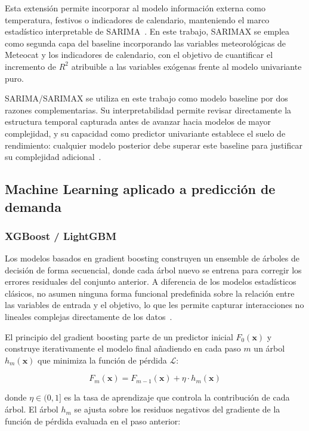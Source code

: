 \documentclass[12pt, a4paper]{article}
\begin{document}
Esta extensión permite incorporar al modelo información externa como temperatura, festivos o indicadores de calendario, manteniendo el marco estadístico interpretable de SARIMA~\cite{hyndman2021}. En este trabajo, SARIMAX se emplea como segunda capa del baseline incorporando las variables meteorológicas de Meteocat y los indicadores de calendario, con el objetivo de cuantificar el incremento de $R^2$ atribuible a las variables exógenas frente al modelo univariante puro.

SARIMA/SARIMAX se utiliza en este trabajo como modelo baseline por dos razones complementarias. Su interpretabilidad permite revisar directamente la estructura temporal capturada antes de avanzar hacia modelos de mayor complejidad, y su capacidad como predictor univariante establece el suelo de rendimiento: cualquier modelo posterior debe superar este baseline para justificar su complejidad adicional~\cite{hyndman2021, boxjenkins2015}.

\subsection{Machine Learning aplicado a predicción de demanda}

\subsubsection{XGBoost / LightGBM}

Los modelos basados en gradient boosting construyen un ensemble de árboles de decisión de forma secuencial, donde cada árbol nuevo se entrena para corregir los errores residuales del conjunto anterior. A diferencia de los modelos estadísticos clásicos, no asumen ninguna forma funcional predefinida sobre la relación entre las variables de entrada y el objetivo, lo que les permite capturar interacciones no lineales complejas directamente de los datos~\cite{chen2016, ke2017}.

El principio del gradient boosting parte de un predictor inicial $F_0(\mathbf{x})$ y construye iterativamente el modelo final añadiendo en cada paso $m$ un árbol $h_m(\mathbf{x})$ que minimiza la función de pérdida $\mathcal{L}$:

\begin{equation}
F_m(\mathbf{x}) = F_{m-1}(\mathbf{x}) + \eta \cdot h_m(\mathbf{x})
\end{equation}

donde $\eta \in (0,1]$ es la tasa de aprendizaje que controla la contribución de cada árbol. El árbol $h_m$ se ajusta sobre los residuos negativos del gradiente de la función de pérdida evaluada en el paso anterior:
\end{document}
